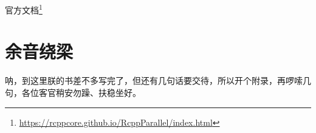 \documentclass[]{ctexbook}
\renewcommand{\href}[2]{#2\footnote{\url{#1}}}
\begin{document}
\href{https://rcppcore.github.io/RcppParallel/index.html}{官方文档}

\cleardoublepage

\hypertarget{appendix-}{%
\appendix {}}


\hypertarget{sound}{%
\chapter{余音绕梁}\label{sound}}

呐，到这里朕的书差不多写完了，但还有几句话要交待，所以开个附录，再啰嗦几句，各位客官稍安勿躁、扶稳坐好。



\backmatter
\printindex
\end{document}

